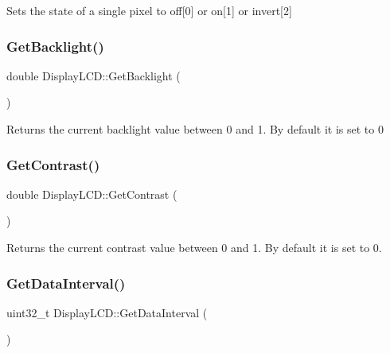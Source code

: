Sets the state of a single pixel to off\mbox{[}0\mbox{]} or on\mbox{[}1\mbox{]} or invert\mbox{[}2\mbox{]}\mbox{\label{classDisplayLCD_af9aa55093dd8b4a11489b2e490aed8cc}} 
\subsubsection{\texorpdfstring{Get\+Backlight()}{GetBacklight()}}
{\footnotesize\ttfamily double Display\+L\+C\+D\+::\+Get\+Backlight (\begin{DoxyParamCaption}{ }\end{DoxyParamCaption})\hspace{0.3cm}{\ttfamily [inline]}}

Returns the current backlight value between 0 and 1. By default it is set to 0\mbox{\label{classDisplayLCD_ab7ec5dfb25093bf45480807989db4049}} 
\subsubsection{\texorpdfstring{Get\+Contrast()}{GetContrast()}}
{\footnotesize\ttfamily double Display\+L\+C\+D\+::\+Get\+Contrast (\begin{DoxyParamCaption}{ }\end{DoxyParamCaption})\hspace{0.3cm}{\ttfamily [inline]}}

Returns the current contrast value between 0 and 1. By default it is set to 0.\mbox{\label{classDisplayLCD_a4d5cb25aaf17312c7639422f44df7071}} 
\subsubsection{\texorpdfstring{Get\+Data\+Interval()}{GetDataInterval()}}
{\footnotesize\ttfamily uint32\+\_\+t Display\+L\+C\+D\+::\+Get\+Data\+Interval (\begin{DoxyParamCaption}{ }\end{DoxyParamCaption})\hspace{0.3cm}{\ttfamily [inline]}}

